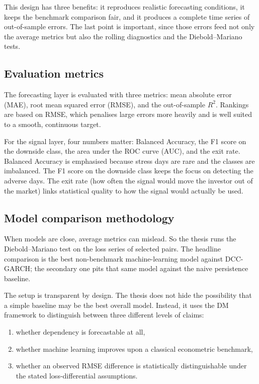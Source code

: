 This design has three benefits: it reproduces realistic forecasting conditions, it keeps the benchmark comparison fair, and it produces a complete time series of out-of-sample errors. The last point is important, since those errors feed not only the average metrics but also the rolling diagnostics and the Diebold--Mariano tests.

\subsection{Evaluation metrics}

The forecasting layer is evaluated with three metrics: mean absolute error (MAE), root mean squared error (RMSE), and the out-of-sample $R^2$. Rankings are based on RMSE, which penalises large errors more heavily and is well suited to a smooth, continuous target.

For the signal layer, four numbers matter: Balanced Accuracy, the F1 score on the downside class, the area under the ROC curve (AUC), and the exit rate. Balanced Accuracy is emphasised because stress days are rare and the classes are imbalanced. The F1 score on the downside class keeps the focus on detecting the adverse days. The exit rate (how often the signal would move the investor out of the market) links statistical quality to how the signal would actually be used.

\subsection{Model comparison methodology}

When models are close, average metrics can mislead. So the thesis runs the Diebold--Mariano test on the loss series of selected pairs. The headline comparison is the best non-benchmark machine-learning model against DCC-GARCH; the secondary one pits that same model against the naive persistence baseline.

The setup is transparent by design. The thesis does not hide the possibility that a simple baseline may be the best overall model. Instead, it uses the DM framework to distinguish between three different levels of claims:

\begin{enumerate}
    \item whether dependency is forecastable at all,
    \item whether machine learning improves upon a classical econometric benchmark,
    \item whether an observed RMSE difference is statistically distinguishable under the stated loss-differential assumptions.
\end{enumerate}


